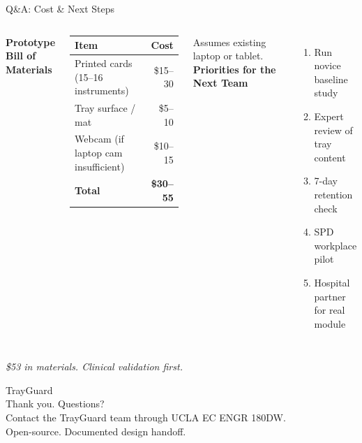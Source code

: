 \documentclass[10pt,aspectratio=169]{beamer}
\newcommand{\takeaway}[1]{%
  \vspace{0.25cm}
  \begin{center}\textit{\small #1}\end{center}
}
\begin{document}
\begin{frame}{Q\&A: Cost \& Next Steps}
  \begin{columns}[T]
    \centering
    \textbf{Prototype Bill of Materials}
    \vspace{0.3cm}
    \begin{tabularx}{\columnwidth}{l r}
      \toprule
      Item & Cost \\
      \midrule
      Printed cards (15--16 instruments) & \$15--30 \\
      Tray surface / mat & \$5--10 \\
      Webcam (if laptop cam insufficient) & \$10--15 \\
      \midrule
      \textbf{Total} & \textbf{\$30--55} \\
      \bottomrule
    \end{tabularx}
    \vspace{0.4cm}
    {\footnotesize Assumes existing laptop or tablet.}
    \textbf{Priorities for the Next Team}
    \vspace{0.3cm}
    \begin{enumerate}
      \item Run novice baseline study

      \item Expert review of tray content

      \item 7-day retention check

      \item SPD workplace pilot

      \item Hospital partner for real module
    \end{enumerate}
  \end{columns}
  \vspace{0.3cm}
  \takeaway{\$53 in materials. Clinical validation first.}
\end{frame}

\begin{frame}
  \centering
  \vfill
  {\Huge TrayGuard}\\[1cm]
  {\large Thank you. Questions?}\\[1cm]
  {\small Contact the TrayGuard team through UCLA EC ENGR 180DW.}\\[0.5cm]
  {\footnotesize Open-source. Documented design handoff.}
  \vfill
\end{frame}
\end{document}
